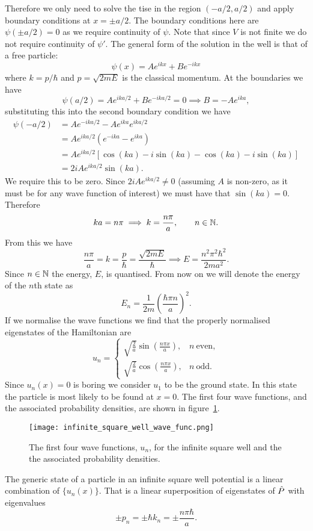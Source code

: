     Therefore we only need to solve the \gls{tise} in the region \((-a/2, a/2)\) and apply boundary conditions at \(x = \pm a/2\).
    The boundary conditions here are \(\psi(\pm a/2) = 0\) as we require continuity of \(\psi\).
    Note that since \(V\) is not finite we do not require continuity of \(\psi'\).
    The general form of the solution in the well is that of a free particle:
    \[\psi(x) = Ae^{ikx} + Be^{-ikx}\]
    where \(k = p/\hbar\) and \(p = \sqrt{2mE}\) is the classical momentum.
    At the boundaries we have
    \[\psi(a/2) = Ae^{ika/2} + Be^{-ika/2} = 0 \implies B = -Ae^{ika},\]
    substituting this into the second boundary condition we have
    \begin{align*}
        \psi(-a/2) &= Ae^{-ika/2} - Ae^{ika}e^{ika/2}\\
        &= Ae^{ika/2}(e^{-ika} - e^{ika})\\
        &= Ae^{ika/2}[\cos(ka) - i\sin(ka) - \cos(ka) - i\sin(ka)]\\
        &= 2iAe^{ika/2}\sin(ka).
    \end{align*}
    We require this to be zero.
    Since \(2iAe^{ika/2}\ne 0\) (assuming \(A\) is non-zero, as it must be for any wave function of interest) we must have that \(\sin(ka) = 0\).
    Therefore
    \[ka = n\pi \implies k = \frac{n\pi}{a},\qquad n\in\mathbb{N}.\]
    From this we have
    \[\frac{n\pi}{a} = k = \frac{p}{\hbar} = \frac{\sqrt{2mE}}{\hbar} \implies E = \frac{n^2\pi^2\hbar^2}{2ma^2}.\]
    Since \(n\in\mathbb{N}\) the energy, \(E\), is quantised.
    From now on we will denote the energy of the \(n\)th state as
    \[E_n = \frac{1}{2m}\left(\frac{\hbar\pi n}{a}\right)^2.\]
    If we normalise the wave functions we find that the properly normalised eigenstates of the Hamiltonian are
    \[
        u_n =
        \begin{cases}
            \sqrt{\frac{2}{a}}\sin\left(\frac{n\pi x}{a}\right), & n~\text{even},\\
            \sqrt{\frac{2}{a}}\cos\left(\frac{n\pi x}{a}\right), & n~\text{odd}.
        \end{cases}
    \]
    Since \(u_n(x) = 0\) is boring we consider \(u_1\) to be the ground state.
    In this state the particle is most likely to be found at \(x = 0\).
    The first four wave functions, and the associated probability densities, are shown in figure~\ref{fig:infinite square well wave functions}.
    \begin{figure}[ht]
        \centering
        \texttt{[image: infinite\_square\_well\_wave\_func.png]}
        \caption{The first four wave functions, \(u_n\), for the infinite square well and the the associated probability densities.}
        \label{fig:infinite square well wave functions}
    \end{figure}
    The generic state of a particle in an infinite square well potential is a linear combination of \(\{u_n(x)\}\).
    That is a linear superposition of eigenstates of \(\hat{P}\) with eigenvalues
    \[\pm p_n = \pm \hbar k_n = \pm\frac{n\pi\hbar}{a}.\]
    
